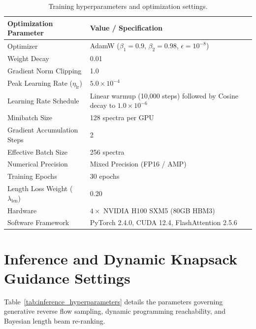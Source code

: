 \begin{table}[!ht]
\centering
\small
\begin{tabular}{ll}
\toprule
\textbf{Optimization Parameter} & \textbf{Value / Specification} \\
\midrule
Optimizer & AdamW ($\beta_1 = 0.9$, $\beta_2 = 0.98$, $\epsilon = 10^{-8}$) \\
Weight Decay & 0.01 \\
Gradient Norm Clipping & 1.0 \\
Peak Learning Rate ($\eta_{\text{lr}}$) & $5.0 \times 10^{-4}$ \\
Learning Rate Schedule & Linear warmup (10,000 steps) followed by Cosine decay to $1.0 \times 10^{-6}$ \\
Minibatch Size & 128 spectra per GPU \\
Gradient Accumulation Steps & 2 \\
Effective Batch Size & 256 spectra \\
Numerical Precision & Mixed Precision (FP16 / AMP) \\
Training Epochs & 30 epochs \\
Length Loss Weight ($\lambda_{\text{len}}$) & 0.20 \\
Hardware & $4 \times$ NVIDIA H100 SXM5 (80GB HBM3) \\
Software Framework & PyTorch 2.4.0, CUDA 12.4, FlashAttention 2.5.6 \\
\bottomrule
\end{tabular}
\caption{Training hyperparameters and optimization settings.}
\label{tab:training_hyperparameters}
\end{table}

\section{Inference and Dynamic Knapsack Guidance Settings}

Table~\ref{tab:inference_hyperparameters} details the parameters governing generative reverse flow sampling, dynamic programming reachability, and Bayesian length beam re-ranking.

